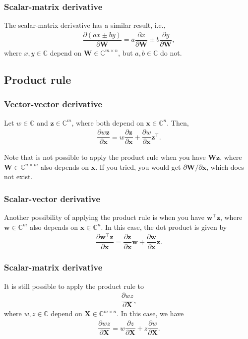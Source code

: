 \documentclass{article}
\newcommand{\trans}{\top}
\begin{document}
\subsubsection{Scalar-matrix derivative}
The scalar-matrix derivative has a similar result, i.e.,
\begin{align}
    \dfrac{\partial \left( ax \pm by \right)}{\partial \mathbf{W}} = a\dfrac{\partial x}{\partial \mathbf{W}} \pm b \dfrac{\partial y}{\partial \mathbf{W}},
\end{align}
where \(x, y \in \mathbb{C}\) depend on \(\mathbf{W} \in \mathbb{C}^{m\times n}\), but \(a,b \in \mathbb{C}\) do not.

\subsection{Product rule}
\subsubsection{Vector-vector derivative}
Let \(w \in \mathbb{C}\) and \(\mathbf{z} \in \mathbb{C}^{m}\), where both depend on \(\mathbf{x} \in \mathbb{C}^{n}\). Then,
\begin{align}
    \dfrac{\partial w \mathbf{z}}{\partial \mathbf{x}} = w \dfrac{\partial \mathbf{z}}{\partial \mathbf{x}} + \dfrac{\partial w}{\partial \mathbf{x}} \mathbf{z}^\trans.
\end{align}

Note that is not possible to apply the product rule when you have \(\mathbf{Wz}\), where \(\mathbf{W} \in \mathbb{C}^{n \times m}\) also depends on \(\mathbf{x}\). If you tried, you would get \(\partial\mathbf{W}/\partial\mathbf{x}\), which does not exist.
\subsubsection{Scalar-vector derivative}
Another possibility of applying the product rule is when you have \(\mathbf{w}^{\trans} \mathbf{z}\), where \(\mathbf{w} \in \mathbb{C}^{m}\) also depends on \(\mathbf{x} \in \mathbb{C}^{n}\). In this case, the dot product is given by
\begin{align}
    \label{eq:scalar-vector-product-rule}
    \dfrac{\partial \mathbf{w}^{\trans} \mathbf{z}}{\partial \mathbf{x}} = \dfrac{\partial \mathbf{z}}{\partial \mathbf{x}} \mathbf{w} + \dfrac{\partial \mathbf{w}}{\partial \mathbf{x}} \mathbf{z}.
\end{align}

\subsubsection{Scalar-matrix derivative}
It is still possible to apply the product rule to
\begin{align}
    \dfrac{\partial wz}{\partial \mathbf{X}},
\end{align}
where \(w,z \in \mathbb{C}\) depend on \(\mathbf{X} \in \mathbb{C}^{m \times n}\). In this case, we have
\begin{align}
    \dfrac{\partial wz}{\partial \mathbf{X}} = w \dfrac{\partial z}{\partial \mathbf{X}} + z \dfrac{\partial w}{\partial \mathbf{X}}.
\end{align}
\end{document}
